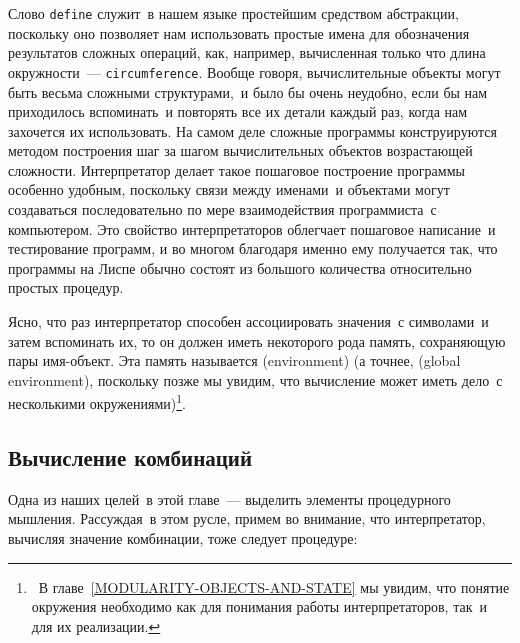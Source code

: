 Слово {\tt define} служит~в нашем языке
простейшим средством абстракции, поскольку оно позволяет нам
использовать простые имена для обозначения результатов сложных
операций, как, например, вычисленная только что длина окружности~---
{\tt circumference}.  Вообще говоря, вычислительные
объекты могут быть весьма сложными структурами,~и было бы очень
неудобно, если бы нам приходилось вспоминать~и повторять все их детали 
каждый раз, когда нам захочется их использовать.  На самом деле
сложные программы конструируются методом построения шаг за шагом
вычислительных объектов возрастающей сложности.  Интерпретатор делает
такое пошаговое построение программы особенно удобным, поскольку связи 
между именами~и объектами могут создаваться последовательно по мере
взаимодействия программиста~с компьютером.  Это свойство
интерпретаторов облегчает
пошаговое написание~и тестирование программ,
и во многом благодаря именно ему получается так,
что программы на Лиспе
обычно состоят из большого количества относительно простых
процедур. 

Ясно, что раз интерпретатор способен
ассоциировать значения~с символами~и затем вспоминать их, то 
он должен иметь некоторого рода память, сохраняющую пары имя-объект.
Эта память называется 
 (environment) (а точнее,
 (global environment), поскольку позже мы увидим, 
что вычисление может иметь дело~с несколькими окружениями)\footnote{~В главе~\ref{MODULARITY-OBJECTS-AND-STATE}
мы увидим, что понятие окружения 
необходимо как для понимания работы интерпретаторов, так~и для их
реализации.}.

\subsection{Вычисление комбинаций}
\label{EVALUATING-COMBINATIONS}


Одна из наших целей~в этой главе~--- выделить элементы
процедурного мышления.  Рассуждая~в этом русле, примем во внимание, что
интерпретатор, вычисляя значение комбинации, тоже следует 
процедуре:

